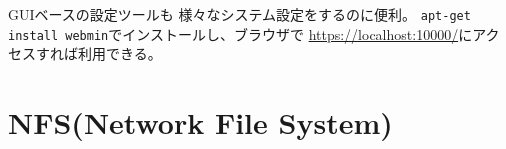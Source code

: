 \documentclass{jreport}
\begin{document}
GUIベースの設定ツールも
様々なシステム設定をするのに便利。
\verb|apt-get install webmin|でインストールし、ブラウザで
\url{https://localhost:10000/}にアクセスすれば利用できる。








\section{NFS(Network File System)}
\end{document}
